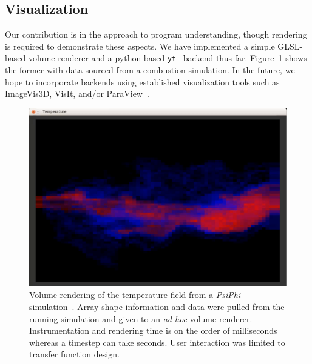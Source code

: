 
\subsection{Visualization}

Our contribution is in the approach to program understanding, though
rendering is required to demonstrate these aspects. We have implemented
a simple GLSL-based volume renderer and a
python-based \texttt{yt}~\cite{Turk:2010:yt} backend thus far.
Figure~\ref{fig:volren} shows the former with data sourced from a
combustion simulation.  In the future, we hope to incorporate backends
using established visualization tools such as ImageVis3D, VisIt, and/or
ParaView~\cite{Fogal:2010:Tuvok, Childs:2012:VisIt,
Ahrens:2005:ParaView}.

\begin{figure}
  \includegraphics[width=\linewidth]{images/dbg/psiphi}


  \caption{Volume rendering of the temperature field from a
  \textit{PsiPhi} simulation~\cite{Proch:2014:PsiPhi}.  Array shape
  information and data were pulled from the running simulation and
  given to an \textit{ad hoc} volume renderer.  Instrumentation and
  rendering time is on the order of milliseconds whereas a timestep
  can take seconds.  User interaction was limited to transfer function
  design.}

  \label{fig:volren}
\end{figure}

